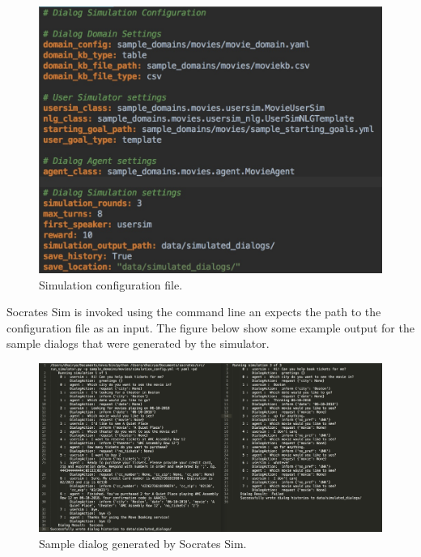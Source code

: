 \begin{figure}[h!]
	\centering
	\includegraphics[scale=.3]{diagrams/movie_sim_config.jpeg}
	\caption{ Simulation configuration file. }
	\label{fig:movie_sim_config }
\end{figure}

\clearpage

Socrates Sim is invoked using the command line an expects the path to the configuration file as an input. The figure below show some example output for the sample dialogs that were generated by the simulator.

\begin{figure}[h!]
	\centering
	\includegraphics[scale=.15]{diagrams/movie_output.jpeg}
	\caption{ Sample dialog generated by Socrates Sim.}
	\label{fig:movie_output}
\end{figure}




